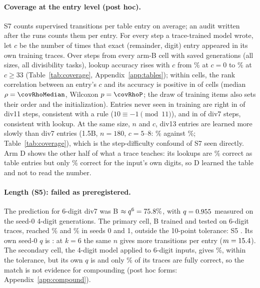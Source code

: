 \documentclass{article}
\theoremstyle{definition}
\begin{document}
\paragraph{Coverage at the entry level (post hoc).} S7 counts supervised transitions per table entry on average; an audit written after the runs counts them per entry. For every step a trace-trained model wrote, let $c$ be the number of times that exact (remainder, digit) entry appeared in its own training traces. Over \covSteps{} steps from every arm-B cell with saved generations (all sizes, all divisibility tasks), lookup accuracy rises with $c$ from \covNTzero\% at $c=0$ to \covNTthirtythree\% at $c\ge33$ (Table~\ref{tab:coverage}, Appendix~\ref{app:tables}); within cells, the rank correlation between an entry's $c$ and its accuracy is positive in \covRhoPos{} of \covRhoCells{} cells (median $\rho=\covRhoMedian$, Wilcoxon $p=\covRhoP$; the draw of training items also sets their order and the initialization). Entries never seen in training are right in \covCzeroElevenK{} of \covCzeroElevenN{} div11 steps, consistent with a rule ($10\equiv-1\pmod{11}$), and in \covCzeroSevenK{} of \covCzeroSevenN{} div7 steps, consistent with lookup. At the same size, $n$ and $c$, div13 entries are learned more slowly than div7 entries (1.5B, $n=180$, $c=5$--8: \covDthirteenfiveeight\% against \covDsevenfiveeight\%; Table~\ref{tab:coverage}), which is the step-difficulty confound of S7 seen directly. Arm D shows the other half of what a trace teaches: its lookups are \covDlookup\% correct as table entries but only \covDlocal\% correct for the input's own digits, so D learned the table and not to read the number.


\paragraph{Length (S5): failed as preregistered.} The prediction for 6-digit div7 was B $\approx q^6=75.8\%$, with $q=0.955$ measured on the seed-0 4-digit generations. The primary cell, B trained and tested on 6-digit traces, reached \divsevenSixBsZero\% and \divsevenSixBsOne\% in seeds 0 and 1, outside the 10-point tolerance: S5 \verdictSFive. Its own seed-0 $q$ is \pDivsevenSixsZero: at $k=6$ the same $n$ gives more transitions per entry ($m=15.4$). The secondary cell, the 4-digit model applied to 6-digit inputs, gives \divsevenTransferSixB\%, within the tolerance, but its own $q$ is \pDivsevenTransfer{} and only \divsevenTransferTraceOK\% of its traces are fully correct, so the match is not evidence for compounding (post hoc forms: Appendix~\ref{app:compound}).
\end{document}
